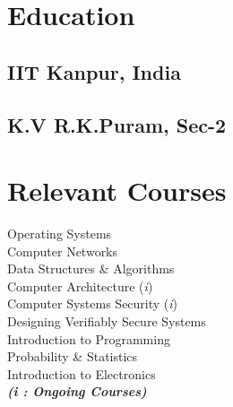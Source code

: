 \documentclass[]{deedy-resume-openfont}
\begin{document}
\begin{minipage}[t]{0.30\textwidth}

\vspace{-0.5cm}
\section{Education}

\subsection{IIT Kanpur, India}
\sectionsep{}

\subsection{K.V R.K.Puram, Sec-2}
\sectionsep{}
%


\section{Relevant Courses}
Operating Systems \\
Computer Networks \\ 
Data Structures \& Algorithms \\
Computer Architecture (\textit{i}) \\
Computer Systems Security (\textit{i})  \\
Designing Verifiably Secure Systems \\
Introduction to Programming \\
Probability \& Statistics \\
Introduction to Electronics \\


{\footnotesize \textit{\textbf{ (i : Ongoing Courses)}}}


\vspace{0.2cm}

\end{minipage}
\end{document}

